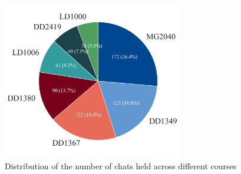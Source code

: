 \begin{figure}[H]
    \centering
    \includegraphics[width=0.7\textwidth]{results/plots/assets/usage-05-number-of-chats-per-course.png}
    \caption{Distribution of the number of chats held across different courses}
    \label{fig:usage_03_number_of_chats_per_course}
\end{figure}
